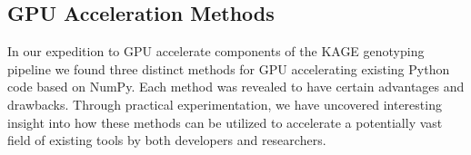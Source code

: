 \subsection{GPU Acceleration Methods}
In our expedition to GPU accelerate components of the KAGE genotyping pipeline we found three distinct methods for GPU accelerating existing Python code based on NumPy.
Each method was revealed to have certain advantages and drawbacks.
Through practical experimentation, we have uncovered interesting insight into how these methods can be utilized to accelerate a potentially vast field of existing tools by both developers and researchers.
